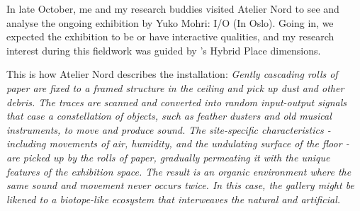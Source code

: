In late October, me and my research buddies visited Atelier Nord to see and analyse the ongoing exhibition by Yuko Mohri: I/O (In Oslo). Going in, we expected the exhibition to be or have interactive qualities, and my research interest during this fieldwork was guided by \autocite{hybridplace_ciolfi}'s Hybrid Place dimensions. 

This is how Atelier Nord describes the installation: 
\emph{Gently cascading rolls of paper are fixed to a framed structure in the ceiling and pick up dust and other debris. The traces are scanned and converted into random input-output signals that case a constellation of objects, such as feather dusters and old musical instruments, to move and produce sound. The site-specific characteristics - including movements of air, humidity, and the undulating surface of the floor - are picked up by the rolls of paper, gradually permeating it with the unique features of the exhibition space. The result is an organic environment where the same sound and movement never occurs twice. In this case, the gallery might be likened to a biotope-like ecosystem that interweaves the natural and artificial.} \autocite{yukomohri_web}

